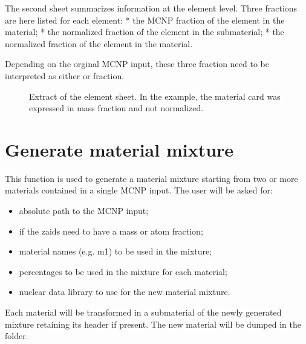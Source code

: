 \documentclass[letterpaper,10pt,english]{sphinxmanual}
\let\sphinxpxdimen\pdfpxdimen\else\newdimen\sphinxpxdimen
\begin{document}
The second sheet summarizes information at the element level.
Three fractions are here listed for each element:
* the MCNP fraction of the element in the material;
* the normalized fraction of the element in the submaterial;
* the normalized fraction of the element in the material.

Depending on the orginal MCNP input, these three fraction need to be
interpreted as either  or  fraction.

\begin{figure}[htbp]
\centering
\capstart

\noindent\sphinxincludegraphics[width=600\sphinxpxdimen]{{printmat2}.png}
\caption{Extract of the element sheet. In the example, the material card was
expressed in mass fraction and not normalized.}\label{\detokenize{usage/utilities:id4}}\end{figure}


\section{Generate material mixture}
\label{\detokenize{usage/utilities:generate-material-mixture}}

This function is used to generate a material mixture starting from two or
more materials contained in a single MCNP input. The user will be asked for:
\begin{itemize}
\item {} 
absolute path to the MCNP input;

\item {} 
if the zaids need to have a mass or atom fraction;

\item {} 
material names (e.g. m1) to be used in the mixture;

\item {} 
percentages to be used in the mixture for each material;

\item {} 
nuclear data library to use for the new material mixture.

\end{itemize}

Each material will be transformed in a submaterial of the newly generated mixture
retaining its header if present. The new material will be dumped in the
 folder.
\end{document}
